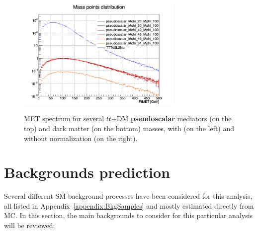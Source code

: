 \documentclass[a4paper, 10pt, openright]{report}
\begin{document}
\begin{figure}[htbp]
{\begin{minipage}[b]{.49\textwidth}
\includegraphics[width=8cm, height=6cm]{figs/pseudoscalarMETmChiLarge.png}
\end{minipage} \hfill
}
\caption{\ac{MET} spectrum for several $t \bar t$+DM \textbf{pseudoscalar} mediators (on the top) and dark matter (on the bottom) masses, with (on the left) and without normalization (on the right).}
\label{fig:signalPseudoscalar}
\end{figure}

\section{Backgrounds prediction} \label{section:Backgrounds}

Several different \ac{SM} background processes have been considered for this analysis, all listed in Appendix~\ref{appendix:BkgSamples} and mostly estimated directly from \ac{MC}. In this section, the main backgrounds to consider for this particular analysis will be reviewed:
\end{document}
